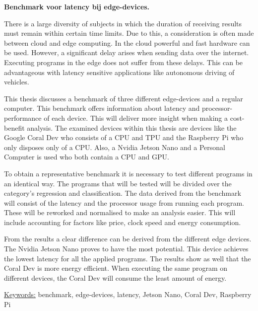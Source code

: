 \textbf{Benchmark voor latency bij edge-devices.}


There is a large diversity of subjects in which the duration of receiving results must remain within certain time limits. Due to this, a consideration is often made between cloud and edge computing. In the cloud powerful and fast hardware can be used. However, a significant delay arises when sending data over the internet. Executing programs in the edge does not suffer from these delays. This can be advantageous with latency sensitive applications like autonomous driving of vehicles.

This thesis discusses a benchmark of three different edge-devices and a regular computer. This benchmark offers information about latency and processor-performance of each device. This will deliver more insight when making a cost-benefit analysis. The examined devices within this thesis are devices like the Google Coral Dev who consists of a CPU and TPU and the Raspberry Pi who only disposes only of a CPU. Also, a Nvidia Jetson Nano and a Personal Computer is used who both contain a CPU and GPU.

To obtain a representative benchmark it is necessary to test different programs in an identical way. The programs that will be tested will be divided over the category's regression and classification. The data derived from the benchmark will consist of the latency and the processor usage from running each program. These will be reworked and normalised to make an analysis easier. This will include accounting for factors like price, clock speed and energy consumption.

From the results a clear difference can be derived from the different edge devices. The Nvidia Jetson Nano proves to have the most potential. This device achieves the lowest latency for all the applied programs. The results show as well that the Coral Dev is more energy efficient. When executing the same program on different devices, the Coral Dev will consume the least amount of energy.


\underline{Keywords:} benchmark, edge-devices, latency, Jetson Nano, Coral Dev, Raspberry Pi